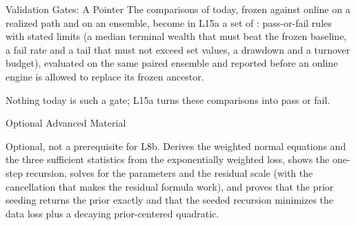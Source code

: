 \documentclass[aspectratio=169,11pt]{beamer}
\begin{document}
\begin{frame}{Validation Gates: A Pointer}
  \vspace{0.6em}
  The comparisons of today, frozen against online on a realized path and on an
  ensemble, become in L15a a set of : pass-or-fail rules
  with stated limits (a median terminal wealth that must beat the frozen
  baseline, a fail rate and a tail that must not exceed set values, a drawdown
  and a turnover budget), evaluated on the same paired ensemble and reported
  before an online engine is allowed to replace its frozen ancestor.

  \vspace{0.8em}
  Nothing today is such a gate; L15a turns these comparisons into pass or fail.
\end{frame}

\begin{frame}{Optional Advanced Material}
  \vspace{0.4em}
  {\normalsize\textbf{} \par
  }

  \vspace{0.7em}
  Optional, not a prerequisite for L8b. Derives the weighted normal equations
  and the three sufficient statistics from the exponentially weighted loss,
  shows the one-step recursion, solves for the parameters and the residual scale
  (with the cancellation that makes the residual formula work), and proves that
  the prior seeding returns the prior exactly and that the seeded recursion
  minimizes the data loss plus a decaying prior-centered quadratic.
\end{frame}
\end{document}
